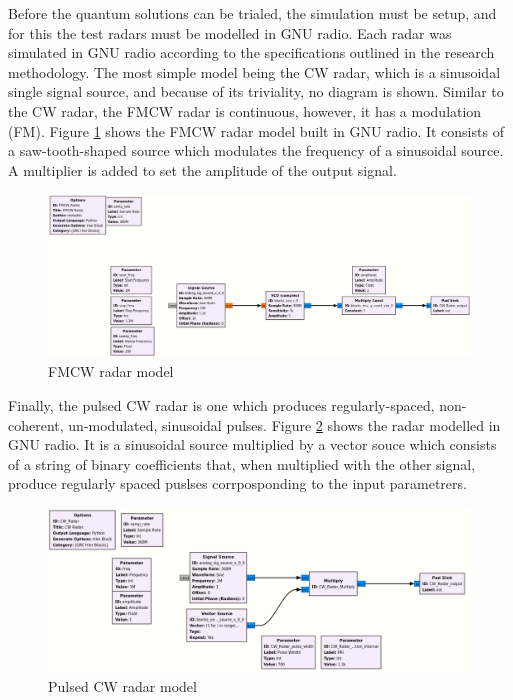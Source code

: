 Before the quantum solutions can be trialed, the simulation must be setup, and for this the test radars must be modelled in GNU radio.
Each radar was simulated in GNU radio according to the specifications outlined in the research methodology.
The most simple model being the \ac{CW} radar, which is a sinusoidal single signal source, and because of its triviality, no diagram is shown.
Similar to the \ac{CW} radar, the \ac{FMCW} radar is continuous, however, it has a modulation (\ac{FM}).
Figure \ref{fig:FMCW} shows the \ac{FMCW} radar model built in GNU radio.
It consists of a saw-tooth-shaped source which modulates the frequency of a sinusoidal source. A multiplier is added to set the amplitude of the output signal.
% 
\begin{figure}[ht]
    \centering
    \includegraphics[width=1\textwidth]{Figures/FMCW.png}
    \caption{\ac{FMCW} radar model}
    \label{fig:FMCW}
\end{figure}
% 
Finally, the pulsed \ac{CW} radar is one which produces regularly-spaced, non-coherent, un-modulated, sinusoidal pulses.
Figure \ref{fig:pulsed_CW} shows the radar modelled in GNU radio. It is a sinusoidal source multiplied by a vector souce which consists of a string of binary coefficients that, when multiplied with the other signal, produce regularly spaced puslses corrposponding to the input parametrers.
% 
\begin{figure}[ht]
    \centering
    \includegraphics[width=1\textwidth]{Figures/pulsed.png}
    \caption{Pulsed \ac{CW} radar model}
    \label{fig:pulsed_CW}
\end{figure}
% 

